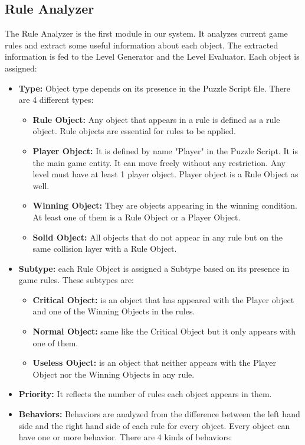 \subsection{Rule Analyzer}
The Rule Analyzer is the first module in our system. It analyzes current game rules and extract some useful information about each object. The extracted information is fed to the Level Generator and the Level Evaluator. Each object is assigned:
\begin{itemize}
	\item \textbf{Type:} Object type depends on its presence in the Puzzle Script file. There are 4 different types:
	\begin{itemize} \itemsep0pt \parskip0pt 
		\item \textbf{Rule Object:} Any object that appears in a rule is defined as a rule object. Rule objects are essential for rules to be applied.
		\item \textbf{Player Object:} It is defined by name "Player" in the Puzzle Script. It is the main game entity. It can move freely without any restriction. Any level must have at least 1 player object. Player object is a Rule Object as well.
		\item \textbf{Winning Object:} They are objects appearing in the winning condition. At least one of them is a Rule Object or a Player Object.
		\item \textbf{Solid Object:} All objects that do not appear in any rule but on the same collision layer with a Rule Object.
	\end{itemize}
	\item \textbf{Subtype:} each Rule Object is assigned a Subtype based on its presence in game rules. These subtypes are:
	\begin{itemize} \itemsep0pt \parskip0pt 
		\item \textbf{Critical Object:} is an object that has appeared with the Player object and one of the Winning Objects in the rules.
		\item \textbf{Normal Object:} same like the Critical Object but it only appears with one of them.
		\item \textbf{Useless Object:} is an object that neither appears with the Player Object nor the Winning Objects in any rule.
	\end{itemize}
	\item \textbf{Priority:} It reflects the number of rules each object appears in them.
	\item \textbf{Behaviors:} Behaviors are analyzed from the difference between the left hand side and the right hand side of each rule for every object. Every object can have one or more behavior. There are 4 kinds of behaviors:

\end{itemize}
